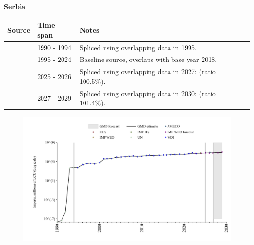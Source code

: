\documentclass[12pt,a4paper,landscape]{article}
\begin{document}
\begin{adjustbox}{max totalsize={\paperwidth}{\paperheight},center}
\begin{minipage}[t][\textheight][t]{\textwidth}
\vspace*{0.5cm}
{}
\begin{center}
{\Large\bfseries Serbia}
\end{center}
\vspace{0.5cm}
\begin{table}[H]
\centering
\small
\begin{tabular}{|l|l|l|}
\hline
\textbf{Source} & \textbf{Time span} & \textbf{Notes} \\
\hline
\rowcolor{white}\cite{UN}& 1990 - 1994 &Spliced using overlapping data in 1995.\\
\rowcolor{lightgray}\cite{EUS}& 1995 - 2024 &Baseline source, overlaps with base year 2018.\\
\rowcolor{white}\cite{AMECO}& 2025 - 2026 &Spliced using overlapping data in 2027: (ratio = 100.5\%).\\
\rowcolor{lightgray}\cite{IMF_WEO_forecast}& 2027 - 2029 &Spliced using overlapping data in 2030: (ratio = 101.4\%).\\
\hline
\end{tabular}
\end{table}
\begin{figure}[H]
\centering
\includegraphics[width=\textwidth,height=0.6\textheight,keepaspectratio]{graphs/SRB_imports.pdf}
\end{figure}
\end{minipage}
\end{adjustbox}
\end{document}
